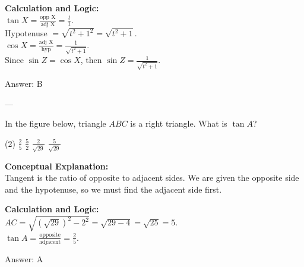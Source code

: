 \documentclass[11pt,paper=a4,answers]{exam}
\begin{document}
\begin{questions}
\begin{solution}
\vspace{10pt}
\textbf{Calculation and Logic:} \\
$\tan X = \frac{\text{opp X}}{\text{adj X}} = \frac{t}{1}$. \\
Hypotenuse $= \sqrt{t^2 + 1^2} = \sqrt{t^2 + 1}$. \\
$\cos X = \frac{\text{adj X}}{\text{hyp}} = \frac{1}{\sqrt{t^2 + 1}}$. \\
Since $\sin Z = \cos X$, then $\sin Z = \frac{1}{\sqrt{t^2 + 1}}$.

\vspace{15pt}
Answer: \colorbox{yellow!100}{B}
\end{solution}

---

\question
In the figure below, triangle $ABC$ is a right triangle. What is $\tan A$?
\begin{center}
\end{center}
\begin{tasks}(2)
    \task $\frac{2}{5}$
    \task $\frac{5}{2}$
    \task $\frac{2}{\sqrt{29}}$
    \task $\frac{5}{\sqrt{29}}$
\end{tasks}

\begin{solution}
\textbf{Conceptual Explanation:} \\
Tangent is the ratio of opposite to adjacent sides. We are given the opposite side and the hypotenuse, so we must find the adjacent side first.

\vspace{10pt}
\textbf{Calculation and Logic:} \\
$AC = \sqrt{(\sqrt{29})^2 - 2^2} = \sqrt{29 - 4} = \sqrt{25} = 5$. \\
$\tan A = \frac{\text{opposite}}{\text{adjacent}} = \frac{2}{5}$.

\vspace{15pt}
Answer: \colorbox{yellow!100}{A}
\end{solution}




\end{questions}
\end{document}
